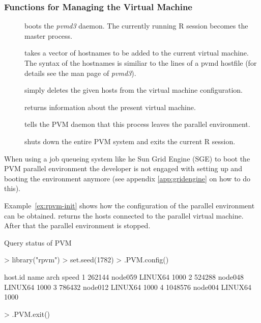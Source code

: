 \subsubsection{Functions for Managing the Virtual Machine}
\begin{description}
\item[] boots the \textit{pvmd3} daemon. The
  currently running R session becomes the master process. 
\item[] takes a vector of hostnames to
  be added to the current virtual machine. The syntax of the
  hostnames is similiar to the lines of a pvmd hostfile (for details
  see the man page of \textit{pvmd3}). 
\item[] simply deletes the given hosts from
  the virtual machine configuration.
\item[] returns information about the present
  virtual machine.
\item[] tells the PVM daemon that this process
  leaves the parallel environment.
\item[] shuts down the entire PVM system and exits
  the current R session.
\end{description}
  
When using a job queueing system like he Sun Grid Engine (SGE) to boot
the PVM parallel environment the developer is not engaged with
setting up and booting the environment anymore (see
appendix \ref{app:gridengine} on how to do this).

Example~\ref{ex:rpvm-init} shows how the configuration of the parallel
environment can be obtained.  returns the hosts
connected to 
the parallel virtual machine. After that the
parallel environment is stopped. 

\begin{Example} Query status of PVM 
\label{ex:rpvm-init}
\begin{Schunk}
\begin{Sinput}
> library("rpvm")
> set.seed(1782)
> .PVM.config()
\end{Sinput}
\begin{Soutput}
  host.id    name    arch speed
1  262144 node059 LINUX64  1000
2  524288 node048 LINUX64  1000
3  786432 node012 LINUX64  1000
4 1048576 node004 LINUX64  1000
\end{Soutput}
\begin{Sinput}
> .PVM.exit()
\end{Sinput}
\end{Schunk}
\end{Example}


